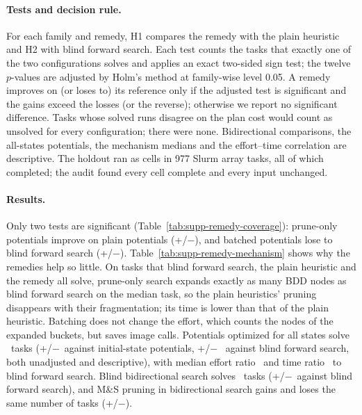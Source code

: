 \documentclass[letterpaper]{article}
\newcommand{\num}[1]{\numprint{#1}}
\theoremstyle{plain}
\theoremstyle{definition}
\theoremstyle{remark}
\begin{document}
\paragraph{Tests and decision rule.}
For each family and remedy, H1 compares the remedy with the plain heuristic
and H2 with blind forward search.  Each test counts the tasks that exactly
one of the two configurations solves and applies an exact two-sided sign
test; the twelve $p$-values are adjusted by Holm's method at family-wise
level 0.05.  A remedy improves on (or loses to) its reference only if the
adjusted test is significant and the gains exceed the losses (or the
reverse); otherwise we report no significant difference.  Tasks whose solved
runs disagree on the plan cost would count as unsolved for every
configuration; there were none.  Bidirectional comparisons, the all-states
potentials, the mechanism medians and the effort--time correlation are
descriptive.  The holdout ran as \num{\RemCells} cells in 977 Slurm array
tasks, all of which completed; the audit found every cell complete and every
input unchanged.

\paragraph{Results.}
Only two tests are significant (Table~\ref{tab:supp-remedy-coverage}):
prune-only potentials improve on plain potentials
(+\RemPotPruneVsPlainGains/$-$\RemPotPruneVsPlainLosses), and batched
potentials lose to blind forward search
(+\RemPotBatchVsBlindGains/$-$\RemPotBatchVsBlindLosses).
Table~\ref{tab:supp-remedy-mechanism} shows why the remedies help so little.
On tasks that blind forward search, the plain heuristic and the remedy all
solve, prune-only search expands exactly as many BDD nodes as blind forward
search on the median task, so the plain heuristics' pruning disappears with
their fragmentation; its time is lower than that of the plain heuristic.
Batching does not change the effort, which counts the nodes of the expanded
buckets, but saves image calls.  Potentials optimized for all states solve
\RemSolvedPotAllPlain\ tasks (+\RemPotAllVsPotGains/$-$\RemPotAllVsPotLosses\
against initial-state potentials, +\RemPotAllVsFwGains/$-$%
\RemPotAllVsFwLosses\ against blind forward search, both unadjusted and
descriptive), with median effort ratio \RemPotAllEffort\ and time ratio
\RemPotAllTime\ to blind forward search.  Blind bidirectional search solves
\RemSolvedBlindBd\ tasks (+\RemBdVsFwGains/$-$\RemBdVsFwLosses\ against blind
forward search), and M\&S pruning in bidirectional search gains and loses
the same number of tasks (+\RemBdMsVsBdGains/$-$\RemBdMsVsBdLosses).
\end{document}
